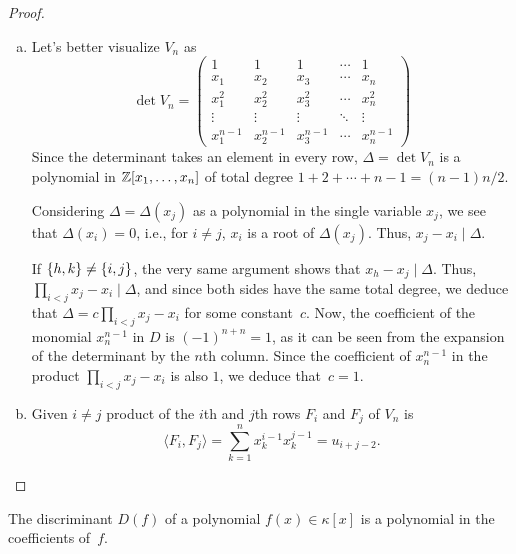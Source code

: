 \begin{proof}${}$
    \begin{enumerate}[a), font=\upshape]
        \item Let's better visualize $V_n$ as
        $$
            \det V_n = \left(
                \begin{array}{lllll}
                    1      & 1      & 1      & \cdots & 1\\
                    x_1    & x_2    & x_3    & \cdots & x_n\\
                    x_1^2  & x_2^2  & x_3^2  & \cdots & x_n^2\\
                    \vdots & \vdots & \vdots & \ddots & \vdots\\
                    x_1^{n-1} & x_2^{n-1} & x_3^{n-1} & \cdots & x_n^{n-1}
                \end{array}
                \right)
        $$
        Since the determinant takes an element in every row, $\Delta=\det V_n$ is a polynomial in $\mathbb{Z}[x_1,\dots,x_n]$ of total degree $1+2+\cdots+n-1=(n-1)n/2$.
        
        Considering $\Delta=\Delta(x_j)$ as a polynomial in the single variable $x_j$, we see that $\Delta(x_i)=0$, i.e., for $i\ne j$, $x_i$ is a root of $\Delta(x_j)$. Thus, $x_j-x_i\mid\Delta$.

        If $\{h,k\}\ne\{i,j\}$, the very same argument shows that $x_h-x_j\mid\Delta$. Thus, $\prod_{i<j}x_j-x_i\mid\Delta$, and since both sides have the same total degree, we deduce that $\Delta=c\prod_{i<j}x_j-x_i$ for some constant~$c$. Now, the coefficient of the monomial $x_n^{n-1}$ in $D$ is $(-1)^{n+n}=1$, as it can be seen from the expansion of the determinant by the $n$th column. Since the coefficient of $x_n^{n-1}$ in the product $\prod_{i<j}x_j-x_i$ is also $1$, we deduce that~$c=1$.

        \item Given $i\ne j$ product of the $i$th and $j$th rows $F_i$ and $F_j$ of $V_n$ is
        $$
            \langle F_i,F_j\rangle
                = \sum_{k=1}^nx_k^{i-1}x_k^{j-1}=u_{i+j-2}.
        $$
    \end{enumerate}
\end{proof}

\begin{cor}\label{cor:discriminant}
    The discriminant\/ $D(f)$ of a polynomial\/ $f(x)\in\kappa[x]$ is a polynomial in the coefficients of\/~$f$.
\end{cor}

